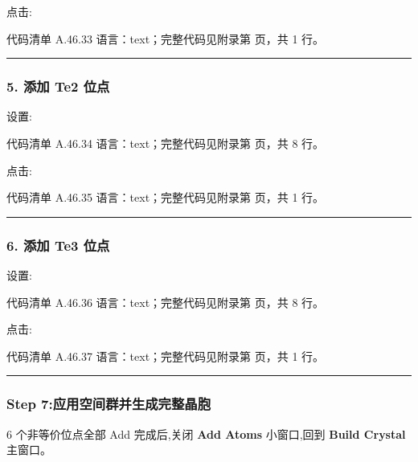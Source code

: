 \documentclass[lang=cn,scheme=chinese,color=blue,device=normal,toc=onecol,math=cm]{elegantbook}
\begin{document}
点击:\par


\begin{codeindexbox}{代码清单 A.46.33}
语言：text；完整代码见附录第 \pageref{code:46:33} 页，共 1 行。
\end{codeindexbox}


\medskip\hrule\medskip


\subsubsection{5. 添加 Te2 位点}


设置:\par


\begin{codeindexbox}{代码清单 A.46.34}
语言：text；完整代码见附录第 \pageref{code:46:34} 页，共 8 行。
\end{codeindexbox}


点击:\par


\begin{codeindexbox}{代码清单 A.46.35}
语言：text；完整代码见附录第 \pageref{code:46:35} 页，共 1 行。
\end{codeindexbox}


\medskip\hrule\medskip


\subsubsection{6. 添加 Te3 位点}


设置:\par


\begin{codeindexbox}{代码清单 A.46.36}
语言：text；完整代码见附录第 \pageref{code:46:36} 页，共 8 行。
\end{codeindexbox}


点击:\par


\begin{codeindexbox}{代码清单 A.46.37}
语言：text；完整代码见附录第 \pageref{code:46:37} 页，共 1 行。
\end{codeindexbox}


\medskip\hrule\medskip


\subsubsection{Step 7:应用空间群并生成完整晶胞}


6 个非等价位点全部 Add 完成后,关闭 \textbf{Add Atoms} 小窗口,回到 \textbf{Build Crystal} 主窗口。\par
\end{document}

